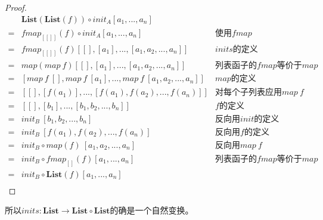 \documentclass{article}
\begin{document}
\begin{example}
\begin{proof}
\[
\begin{array}{cll}
  & \mathbf{List}(\mathbf{List}(f)) \circ init_A [a_1, ..., a_n] & \\
= & fmap_{[[]]}(f) \circ init_A [a_1, ..., a_n] & \text{使用$fmap$} \\
= & fmap_{[[]]}(f) [[], [a_1], ..., [a_1, a_2, ..., a_n]] & \text{$inits$的定义} \\
= & map(map\ f) [[], [a_1], ..., [a_1, a_2, ..., a_n]] & \text{列表函子的$fmap$等价于$map$} \\
= & [map\ f\ [], map\ f\ [a_1], ..., map\ f\ [a_1, a_2, ..., a_n]] & \text{$map$的定义} \\
= & [[], [f(a_1)], ..., [f(a_1), f(a_2), ..., f(a_n)]] & \text{对每个子列表应用$map\ f$} \\
= & [[], [b_1], ..., [b_1, b_2, ..., b_n]] & \text{$f$的定义} \\
= & init_B\ [b_1, b_2, ..., b_n] & \text{反向用$init$的定义} \\
= & init_B\ [f(a_1), f(a_2), ..., f(a_n)] & \text{反向用$f$的定义} \\
= & init_B \circ map(f)\ [a_1, a_2, ..., a_n] & \text{反向用$map\ f$} \\
= & init_B \circ fmap_{[]}(f) [a_1, ..., a_n] & \text{列表函子的$fmap$等价于$map$} \\
= & init_B \circ \mathbf{List}(f) [a_1, ..., a_n] & \\
\end{array}
\]
\end{proof}

所以$inits : \mathbf{List} \to \mathbf{List} \circ \mathbf{List}$的确是一个自然变换。
\end{example}
\end{document}
